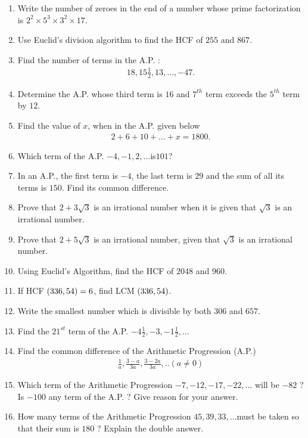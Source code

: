 \begin{enumerate}
\item Write the number of zeroes in the end of a number whose prime factorization is $2^2 \times 5^3 \times 3^2 \times 17$.

\item Use Euclid's division algorithm to find the HCF of $255$ and $867$.

\item Find the number of terms in the A.P. :
\begin{align*}
    18,15\frac{1}{2},13, ...,-47.
\end{align*}

\item Determine the A.P. whose third term is $16$ and $7^{th}$ term exceeds the $5^{th}$ term by $12$.

\item Find the value of $x$, when in the A.P. given below
\begin{align*}
2 + 6 + 10 + ... + x = 1800.    
\end{align*}

\item Which term of the A.P. $-4, - 1, 2, ... $is$ 101$?

\item In an A.P., the first term is $- 4$, the last term is $29$ and the sum of all its terms is $150$. Find its common difference.

\item Prove that $2 + 3\sqrt{3}$ is an irrational number when it is given that $\sqrt{3}$ is an irrational number.

\item Prove that $2+5\sqrt{3}$ is an irrational number, given that $\sqrt{3}$ is an irrational number.

\item Using Euclid's Algorithm, find the HCF of $2048$ and $960$.

\item If HCF $\left(336, 54\right) = 6$, find LCM $\left(336, 54\right)$.

\item Write the smallest number which is divisible by both $306$ and $657$.

\item Find the $21^{st}$ term of the A.P. $-4 \frac{1}{2},-3,-1\frac{1}{2},...$

\item Find the common difference of the Arithmetic Progression (A.P.) 
\begin{align*}
\frac{1}{a} , \frac{3-a}{3a},\frac{3-2a}{3a} , . . (a \neq 0)
\end{align*}

\item Which term of the Arithmetic Progression $-7, -12, -17, -22, ... $ will be $-82$ ? Is $-100$ any term of the A.P. ? Give reason for your answer.

\item How many terms of the Arithmetic Progression $45, 39, 33, ... $must be taken so that their sum is $180$ ? Explain the double answer.
\end{enumerate}

